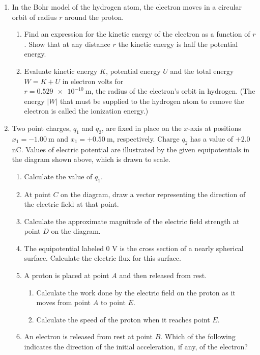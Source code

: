 \documentclass{../../../oss-apphys}
\begin{document}
\begin{enumerate}[leftmargin=15pt]
\item In the Bohr model of the hydrogen atom, the electron moves in a circular
  orbit of radius $r$ around the proton.
  \begin{enumerate}[leftmargin=15pt]
  \item Find an expression for the kinetic energy of the electron as a function
    of $r$. Show that at any distance $r$ the kinetic energy is half the
    potential energy.
  \item Evaluate kinetic energy $K$, potential energy $U$ and the total
    energy $W=K+U$ in electron volts for\\ $r=\SI{0.529e-10}{\metre}$, the
    radius of the electron's orbit in hydrogen. (The energy $|W|$ that must be
    supplied to the hydrogen atom to remove the electron is called the
    ionization energy.)
  \end{enumerate}
  \newpage

  \begin{center}
  \end{center}
\item Two point charges, $q_1$ and $q_2$, are fixed in place on the $x$-axis at
  positions $x_1=\SI{-1.00}{\metre}$ and $x_1=+\SI{0.50}{\metre}$,
  respectively. Charge $q_2$ has a value of $+2.0$ nC. Values of electric
  potential are illustrated by the given equipotentials in the diagram shown
  above, which is drawn to scale.
  \begin{enumerate}[leftmargin=15pt]
  \item Calculate the value of $q_1$.
  \item At point $C$ on the diagram, draw a vector representing the direction
    of the electric field at that point.
  \item Calculate the approximate magnitude of the electric field strength at
    point $D$ on the diagram.
  \item The equipotential labeled 0 V is the cross section of a nearly
    spherical surface. Calculate the electric flux for this surface.
    \newpage
    
  \item A proton is placed at point $A$ and then released from rest.
    \begin{enumerate}[leftmargin=15pt]
    \item Calculate the work done by the electric field on the proton as it
      moves from point $A$ to point $E$.
    \item Calculate the speed of the proton when it reaches point $E$.
    \end{enumerate}
  \item An electron is released from rest at point $B$. Which of the following
    indicates the direction of the initial acceleration, if any, of the
    electron?


\end{enumerate}
\end{enumerate}
\end{document}

